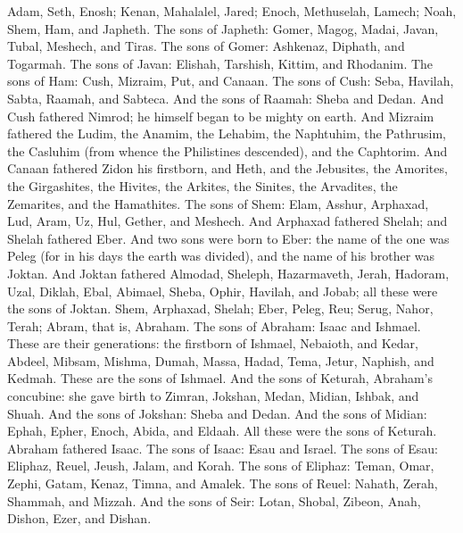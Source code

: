 
\begin{biblechapter} %
 Adam, Seth, Enosh;
\verse Kenan, Mahalalel, Jared;
\verse Enoch, Methuselah, Lamech;
\verse Noah, Shem, Ham, and Japheth.
\verse The sons of Japheth: Gomer, Magog, Madai, Javan, Tubal, Meshech, and Tiras.
\verse The sons of Gomer: Ashkenaz, Diphath, and Togarmah.
\verse The sons of Javan: Elishah, Tarshish, Kittim, and Rhodanim.
\verse The sons of Ham: Cush, Mizraim, Put, and Canaan.
\verse The sons of Cush: Seba, Havilah, Sabta, Raamah, and Sabteca. And the sons of Raamah: Sheba and Dedan.
\verse And Cush fathered Nimrod; he himself began to be mighty on earth.
\verse And Mizraim fathered the Ludim, the Anamim, the Lehabim, the Naphtuhim,
\verse the Pathrusim, the Casluhim (from whence the Philistines descended), and the Caphtorim.
\verse And Canaan fathered Zidon his firstborn, and Heth,
\verse and the Jebusites, the Amorites, the Girgashites,
\verse the Hivites, the Arkites, the Sinites,
\verse the Arvadites, the Zemarites, and the Hamathites.
\verse The sons of Shem: Elam, Asshur, Arphaxad, Lud, Aram, Uz, Hul, Gether, and Meshech.
\verse And Arphaxad fathered Shelah; and Shelah fathered Eber.
\verse And two sons were born to Eber: the name of the one was Peleg (for in his days the earth was divided), and the name of his brother was Joktan.
\verse And Joktan fathered Almodad, Sheleph, Hazarmaveth, Jerah,
\verse Hadoram, Uzal, Diklah,
\verse Ebal, Abimael, Sheba,
\verse Ophir, Havilah, and Jobab; all these were the sons of Joktan.
\verse Shem, Arphaxad, Shelah;
\verse Eber, Peleg, Reu;
\verse Serug, Nahor, Terah;
\verse Abram, that is, Abraham.
\verse The sons of Abraham: Isaac and Ishmael.
\verse These are their generations: the firstborn of Ishmael, Nebaioth, and Kedar, Abdeel, Mibsam,
\verse Mishma, Dumah, Massa, Hadad, Tema,
\verse Jetur, Naphish, and Kedmah. These are the sons of Ishmael.
\verse And the sons of Keturah, Abraham’s concubine: she gave birth to Zimran, Jokshan, Medan, Midian, Ishbak, and Shuah. And the sons of Jokshan: Sheba and Dedan.
\verse And the sons of Midian: Ephah, Epher, Enoch, Abida, and Eldaah. All these were the sons of Keturah.
\verse Abraham fathered Isaac. The sons of Isaac: Esau and Israel.
\verse The sons of Esau: Eliphaz, Reuel, Jeush, Jalam, and Korah.
\verse The sons of Eliphaz: Teman, Omar, Zephi, Gatam, Kenaz, Timna, and Amalek.
\verse The sons of Reuel: Nahath, Zerah, Shammah, and Mizzah.
\verse And the sons of Seir: Lotan, Shobal, Zibeon, Anah, Dishon, Ezer, and Dishan.

\end{biblechapter}
